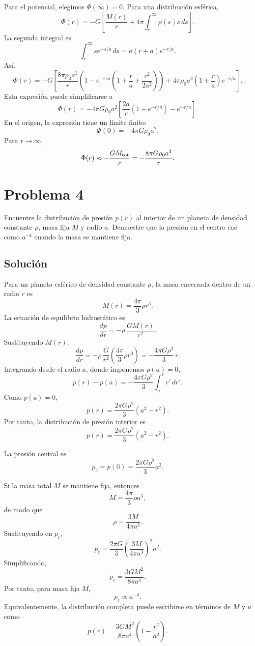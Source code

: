 \documentclass[a4paper]{article}
\begin{document}
Para el potencial, elegimos $\Phi(\infty)=0$. Para una distribución esférica,
$$
\Phi(r)
=
-G\left[
\frac{M(r)}{r}
+
4\pi\int_r^\infty \rho(s)s\,ds
\right].
$$
La segunda integral es
$$
\int_r^\infty s e^{-s/a}\,ds
=
a(r+a)e^{-r/a}.
$$
Así,
$$
\Phi(r)
=
-G\left[
\frac{8\pi\rho_0 a^3}{r}
\left(
1-e^{-r/a}
\left(
1+\frac{r}{a}+\frac{r^2}{2a^2}
\right)
\right)
+
4\pi\rho_0 a^2
\left(1+\frac{r}{a}\right)e^{-r/a}
\right].
$$
Esta expresión puede simplificarse a
$$
\boxed{
\Phi(r)
=
-4\pi G\rho_0 a^2
\left[
\frac{2a}{r}\left(1-e^{-r/a}\right)
-
e^{-r/a}
\right]
}.
$$
En el origen, la expresión tiene un límite finito:
$$
\Phi(0)=-4\pi G\rho_0 a^2.
$$
Para $r\to\infty$,
$$
\Phi(r)\approx -\frac{G M_{\rm tot}}{r}
=
-\frac{8\pi G\rho_0 a^3}{r}.
$$


\section{Problema 4}

Encuentre la distribución de presión $p(r)$ al interior de un planeta de densidad constante $\rho$, masa fija $M$ y radio $a$. Demuestre que la presión en el centro cae como $a^{-4}$ cuando la masa se mantiene fija.

\subsection{Solución}
Para un planeta esférico de densidad constante $\rho$, la masa encerrada dentro de un radio $r$ es
$$
M(r)=\frac{4\pi}{3}\rho r^3.
$$
La ecuación de equilibrio hidrostático es
$$
\frac{dp}{dr}=-\rho\,\frac{G M(r)}{r^2}.
$$
Sustituyendo $M(r)$,
$$
\frac{dp}{dr}
=
-\rho\,\frac{G}{r^2}\left(\frac{4\pi}{3}\rho r^3\right)
=
-\frac{4\pi G\rho^2}{3}\,r.
$$
Integrando desde el radio $a$, donde imponemos $p(a)=0$,
$$
p(r)-p(a)
=
-\frac{4\pi G\rho^2}{3}\int_a^r r'\,dr'.
$$
Como $p(a)=0$,
$$
p(r)
=
\frac{2\pi G\rho^2}{3}(a^2-r^2).
$$
Por tanto, la distribución de presión interior es
$$
\boxed{
p(r)=\frac{2\pi G\rho^2}{3}(a^2-r^2)
}.
$$



La presión central es
$$
p_c=p(0)=\frac{2\pi G\rho^2}{3}a^2.
$$

Si la masa total $M$ se mantiene fija, entonces
$$
M=\frac{4\pi}{3}\rho a^3,
$$
de modo que
$$
\rho=\frac{3M}{4\pi a^3}.
$$
Sustituyendo en $p_c$,
$$
p_c
=
\frac{2\pi G}{3}
\left(\frac{3M}{4\pi a^3}\right)^2
a^2.
$$
Simplificando,
$$
\boxed{
p_c=\frac{3GM^2}{8\pi a^4}
}.
$$
Por tanto, para masa fija $M$,
$$
\boxed{
p_c\propto a^{-4}
}.
$$
Equivalentemente, la distribución completa puede escribirse en términos de $M$ y $a$ como
$$
\boxed{
p(r)=\frac{3GM^2}{8\pi a^4}
\left(1-\frac{r^2}{a^2}\right)
}.
$$
\end{document}
